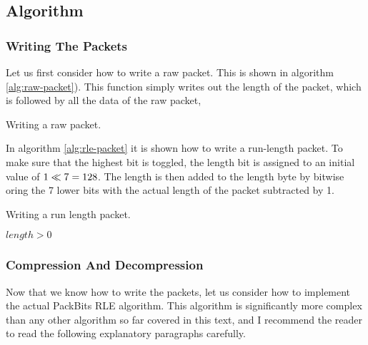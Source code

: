 \subsection{Algorithm}

\subsubsection{Writing The Packets}

Let us first consider how to write a raw packet. This is shown in
algorithm \ref{alg:raw-packet}). This function simply writes out the
length of the packet, which is followed by all the data of the raw
packet,

\begin{algorithm}
  \caption{Writing a raw packet.}
  \label{alg:raw-packet}
  \begin{algorithmic}[1]
    \State {}
    \State {}
    \EndForEach
    \EndFunction
  \end{algorithmic}
\end{algorithm}

In algorithm \ref{alg:rle-packet} it is shown how to write a
run-length packet. To make sure that the highest bit is toggled, the
length bit is assigned to an initial value of $1 \ll 7 =
128$. The length is then added to the length byte by bitwise oring the
7 lower bits with the actual length of the packet subtracted by 1.

\begin{algorithm}
  \caption{Writing a run length packet.}
  \label{alg:rle-packet}
  \begin{algorithmic}[1]
    \Require $length > 0$
    \State {}
    \State {}
    \EndFunction
  \end{algorithmic}
\end{algorithm}

\subsubsection{Compression And Decompression}
\label{sec:compr-decompr}


Now that we know how to write the packets, let us consider how to
implement the actual PackBits RLE algorithm. This algorithm is
significantly more complex than any other algorithm so far covered in
this text, and I recommend the reader to read the following
explanatory paragraphs carefully.

